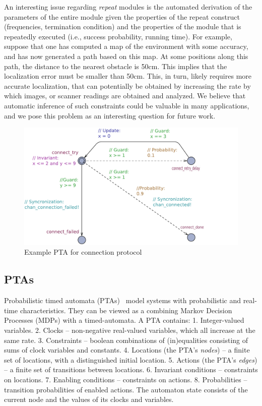 \documentclass[letterpaper]{article}
\newcommand\note[1]{\todo[inline, color=red!40]{#1}}
\begin{document}
{%
An interesting issue regarding \textit{repeat} modules is the automated derivation of the parameters of the entire module given the properties of the repeat construct (frequencies, termination condition) and the properties of the module that is repeatedly executed (i.e., success probability, running time). For example, suppose that one has computed a map of the environment with some accuracy, and has now generated a path based on this map. At some positions along this
path, the distance to the nearest obstacle is 50cm. This implies that the localization error must be smaller than 50cm.
This, in turn, likely requires more accurate localization, that can potentially be obtained by increasing the rate by which images, or scanner readings are obtained and analyzed. We believe that automatic inference of such constraints could
be valuable in many applications, and we pose this problem as an interesting question for future work.
}


\begin{figure}[t]
\centering
\includegraphics[scale=0.51]{examplePta_eps_converted_to_update.pdf}
\caption{Example PTA for connection protocol}
\label{fig:examplePTA}
\vspace{-0.2cm}
\end{figure}

\subsection{PTAs}
\par Probabilistic timed automata (PTAs)~\citep{PTA}  model systems with probabilistic and real-time characteristics. They can be viewed
as a combining Markov Decision Processes (MDPs) with a timed-automata.
A PTA contains: 1. Integer-valued variables. 2. Clocks -- non-negative real-valued variables, which all increase at the same rate. 3. Constraints -- boolean combinations of
(in)equalities consisting of sums of clock variables and constants.  4. Locations (the PTA's \textit{nodes}) -- a finite set of locations, with 
a distinguished initial location. 5. Actions (the PTA's \textit{edges}) -- a finite set of transitions between locations. 6. Invariant conditions -- constraints on locations. 7. Enabling conditions -- constraints on actions. 8. Probabilities -- transition probabilities of enabled actions. The automaton state consists of the current node and the values of its clocks and variables. 
\end{document}
